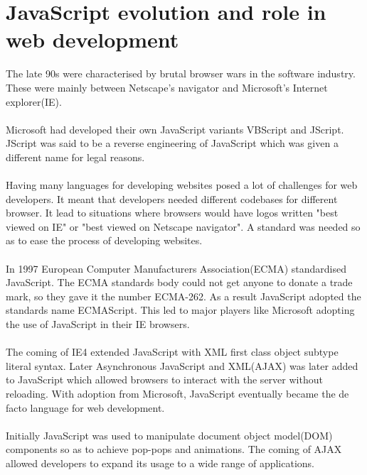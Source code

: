 \section{JavaScript evolution and role in web development}
The late 90s were characterised by brutal browser wars in the software industry\cite{wars}. These were mainly between Netscape's navigator and Microsoft's Internet explorer(IE).
\paragraph{}
Microsoft had developed their own JavaScript variants VBScript and JScript. JScript was said to be a reverse engineering of JavaScript which was given a different name for legal reasons.
\paragraph{}
Having many languages for developing websites posed a lot of challenges for web developers. It meant that developers needed different codebases for different browser. It lead to situations where browsers would have logos written "best viewed on IE" or "best viewed on Netscape navigator". A standard was needed so as to ease the process of developing websites.
\paragraph{}
In 1997 European Computer Manufacturers Association(ECMA) standardised JavaScript. The ECMA standards body could not get anyone to donate a trade mark, so they gave it the number ECMA-262. As a result JavaScript adopted the standards name ECMAScript. This led to major players like Microsoft adopting the use of JavaScript in their IE browsers.
\paragraph{}
The coming of IE4 extended JavaScript with XML first class object subtype literal syntax\cite{Eich:2005:JTY:1090189.1086382}. Later Asynchronous JavaScript and XML(AJAX) was later added to JavaScript which allowed browsers to interact with the server without reloading. With adoption from Microsoft, JavaScript eventually became the de facto language for web development.
\paragraph{}
Initially JavaScript was used to manipulate document object model(DOM) components so as to achieve pop-pops and animations. The coming of AJAX allowed developers to expand its usage to a wide range of applications.
